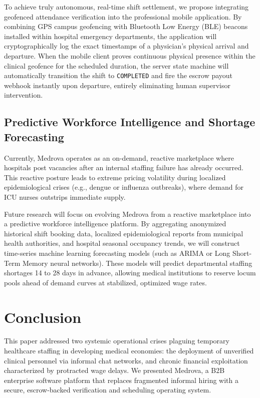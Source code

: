 \documentclass[conference]{IEEEtran}
\begin{document}
To achieve truly autonomous, real-time shift settlement, we propose integrating geofenced attendance verification into the professional mobile application. By combining GPS campus geofencing with Bluetooth Low Energy (BLE) beacons installed within hospital emergency departments, the application will cryptographically log the exact timestamps of a physician's physical arrival and departure. When the mobile client proves continuous physical presence within the clinical geofence for the scheduled duration, the server state machine will automatically transition the shift to \texttt{COMPLETED} and fire the escrow payout webhook instantly upon departure, entirely eliminating human supervisor intervention.

\subsection{Predictive Workforce Intelligence and Shortage Forecasting}
Currently, Medrova operates as an on-demand, reactive marketplace where hospitals post vacancies after an internal staffing failure has already occurred. This reactive posture leads to extreme pricing volatility during localized epidemiological crises (e.g., dengue or influenza outbreaks), where demand for ICU nurses outstrips immediate supply.

Future research will focus on evolving Medrova from a reactive marketplace into a predictive workforce intelligence platform. By aggregating anonymized historical shift booking data, localized epidemiological reports from municipal health authorities, and hospital seasonal occupancy trends, we will construct time-series machine learning forecasting models (such as ARIMA or Long Short-Term Memory neural networks). These models will predict departmental staffing shortages 14 to 28 days in advance, allowing medical institutions to reserve locum pools ahead of demand curves at stabilized, optimized wage rates.

\section{Conclusion}
This paper addressed two systemic operational crises plaguing temporary healthcare staffing in developing medical economies: the deployment of unverified clinical personnel via informal chat networks, and chronic financial exploitation characterized by protracted wage delays. We presented Medrova, a B2B enterprise software platform that replaces fragmented informal hiring with a secure, escrow-backed verification and scheduling operating system.
\end{document}
